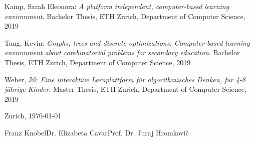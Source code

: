 \documentclass[a4paper,oneside,11pt,final]{scrartcl}
\newcommand{\student}{Franz Knobel}
\newcommand{\professor}{Prof. Dr. Juraj Hromkovi\v{c}}
\newcommand{\cosupervisor}{Dr. Elizabeta Cavar}
\begin{document}
\begin{thebibliography}{9}
 Kamp, Sarah Eleonora: \textit{A platform independent,
computer-based learning environment}. Bachelor Thesis, ETH Zurich, Department of
Computer Science, 2019

 Tang, Kevin: \textit{Graphs, trees and discrete optimizations:
Computer-based learning environment about combinatorial problems for secondary
education}. Bachelor Thesis, ETH Zurich, Department of Computer Science, 2019

 Weber, Jil: \textit{Eine interaktive Lernplattform f\"ur
algorithmisches Denken, f\"ur 4-8 j\"ahrige Kinder}. Master Thesis, ETH Zurich,
Department of Computer Science, 2019

\end{thebibliography}

\vspace{1cm}
\noindent Zurich, \today 

\vspace{2.0cm}
\noindent \student \hfill \cosupervisor \hfill \professor \hfill
\end{document}

